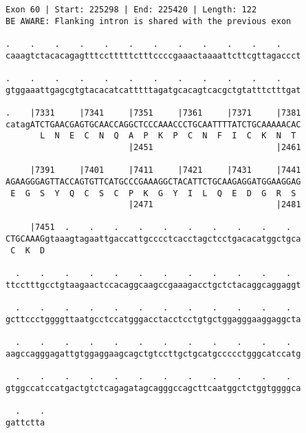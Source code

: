 \documentclass{article}
\begin{document}
\begin{Verbatim}[fontfamily=courier]
Exon 60 | Start: 225298 | End: 225420 | Length: 122
BE AWARE: Flanking intron is shared with the previous exon

.    .    .    .    .    .    .    .    .    .    .    .    
caaagtctacacagagtttcctttttctttccccgaaactaaaattcttcgttagaccct

.    .    .    .    .    .    .    .    .    .    .    .    
gtggaaattgagcgtgtacacatcatttttagatgcacagtcacgctgtatttctttgat

.    |7331     |7341     |7351     |7361     |7371     |7381
catagATCTGAACGAGTGCAACCAGGCTCCCAAACCCTGCAATTTTATCTGCAAAAACAC
       L  N  E  C  N  Q  A  P  K  P  C  N  F  I  C  K  N  T 
                         |2451                         |2461

     |7391     |7401     |7411     |7421     |7431     |7441
AGAAGGGAGTTACCAGTGTTCATGCCCGAAAGGCTACATTCTGCAAGAGGATGGAAGGAG
 E  G  S  Y  Q  C  S  C  P  K  G  Y  I  L  Q  E  D  G  R  S 
                         |2471                         |2481

     |7451  .    .    .    .    .    .    .    .    .    .  
CTGCAAAGgtaaagtagaattgaccattgcccctcacctagctcctgacacatggctgca
 C  K  D                                                    

  .    .    .    .    .    .    .    .    .    .    .    .  
ttcctttgcctgtaagaactccacaggcaagccgaaagacctgctctacaggcaggaggt

  .    .    .    .    .    .    .    .    .    .    .    .  
gcttccctggggttaatgcctccatgggacctacctcctgtgctggagggaaggaggcta

  .    .    .    .    .    .    .    .    .    .    .    .  
aagccagggagattgtggaggaagcagctgtccttgctgcatgccccctgggcatccatg

  .    .    .    .    .    .    .    .    .    .    .    .  
gtggccatccatgactgtctcagagatagcagggccagcttcaatggctctggtggggca

  .    .
gattctta
\end{Verbatim}
\newpage
\end{document}
